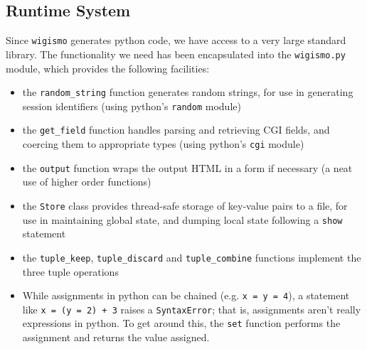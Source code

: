 \documentclass{WigReport}
\begin{document}
\subsection{Runtime System}
Since {\tt wigismo} generates python code, we have access to a very large
standard library. The functionality we need has been encapsulated into the
{\tt wigismo.py} module, which provides the following facilities:

\begin{itemize}
\item the {\tt random\_string} function generates random strings, for use
in generating session identifiers (using python's {\tt random} module) 
\item the {\tt get\_field} function handles parsing and retrieving CGI 
fields, and coercing them to appropriate types (using python's {\tt cgi}
module)
\item the {\tt output} function wraps the output HTML in a form if
necessary (a neat use of higher order functions)
\item the {\tt Store} class provides thread-safe storage of key-value pairs
to a file, for use in maintaining global state, and dumping local state
following a {\tt show} statement
\item the {\tt tuple\_keep}, {\tt tuple\_discard} and {\tt tuple\_combine}
functions implement the three tuple operations
\item While assignments in python can be chained (e.g. {\tt x = y = 4}), a
statement like {\tt x = (y = 2) + 3} raises a {\tt SyntaxError}; that is,
assignments aren't really expressions in python. To get around this, the
{\tt set} function performs the assignment and returns the value assigned.
\end{itemize}
\end{document}
